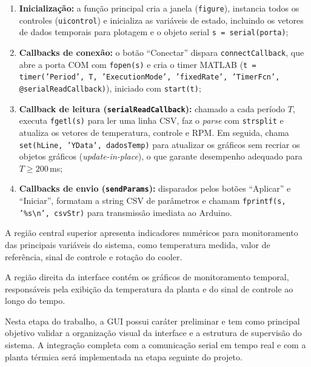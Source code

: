 \documentclass[repeatfields,xlists,xpacks,oneside]{ufrgscca}
\begin{document}
\begin{enumerate}
    \item \textbf{Inicialização:} a função principal cria a
    janela (\texttt{figure}), instancia todos os controles
    (\texttt{uicontrol}) e inicializa as variáveis de estado,
    incluindo os vetores de dados temporais para plotagem e
    o objeto serial \texttt{s = serial(porta)};

    \item \textbf{Callbacks de conexão:} o botão
    ``Conectar'' dispara \texttt{connectCallback}, que abre
    a porta COM com \texttt{fopen(s)} e cria o timer MATLAB
    (\texttt{t = timer('Period', T, 'ExecutionMode',
    'fixedRate', 'TimerFcn', @serialReadCallback)}), iniciado
    com \texttt{start(t)};

    \item \textbf{Callback de leitura (\texttt{serialReadCallback}):}
    chamado a cada período $T$, executa \texttt{fgetl(s)}
    para ler uma linha CSV, faz o \textit{parse} com
    \texttt{strsplit} e atualiza os vetores de temperatura,
    controle e RPM\@. Em seguida, chama \texttt{set(hLine,
    'YData', dadosTemp)} para atualizar os gráficos sem
    recriar os objetos gráficos (\textit{update-in-place}),
    o que garante desempenho adequado para $T \geq 200$\,ms;

    \item \textbf{Callbacks de envio (\texttt{sendParams}):}
    disparados pelos botões ``Aplicar'' e ``Iniciar'',
    formatam a string CSV de parâmetros e chamam
    \texttt{fprintf(s, '\%s\textbackslash n', csvStr)} para
    transmissão imediata ao Arduino.
\end{enumerate}

A região central superior apresenta indicadores numéricos
para monitoramento das principais variáveis do sistema,
como temperatura medida, valor de referência, sinal de
controle e rotação do cooler.

A região direita da interface contém os gráficos de
monitoramento temporal, responsáveis pela exibição da
temperatura da planta e do sinal de controle ao longo do
tempo.

Nesta etapa do trabalho, a GUI possui caráter preliminar e
tem como principal objetivo validar a organização visual da
interface e a estrutura de supervisão do sistema.
A integração completa com a comunicação serial em tempo real
e com a planta térmica será implementada na etapa seguinte
do projeto.


\end{document}
